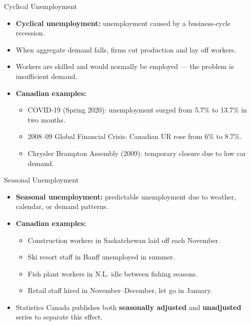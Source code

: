 \documentclass[aspectratio=169]{beamer}
\begin{document}
\begin{frame}{Cyclical Unemployment}
\transfade
\begin{itemize}
  \item \textbf{Cyclical unemployment:} unemployment caused by a \alert{business-cycle recession}.
  \item When aggregate demand falls, firms cut production and lay off workers.
  \item Workers are skilled and would normally be employed --- the problem is insufficient demand.
  \item \textbf{Canadian examples:}
  \begin{itemize}
    \item COVID-19 (Spring 2020): unemployment surged from 5.7\% to 13.7\% in two months.
    \item 2008--09 Global Financial Crisis: Canadian UR rose from 6\% to 8.7\%.
    \item Chrysler Brampton Assembly (2009): temporary closure due to low car demand.
  \end{itemize}
\end{itemize}
\end{frame}

\begin{frame}{Seasonal Unemployment}
\transfade
\begin{itemize}
  \item \textbf{Seasonal unemployment:} predictable unemployment due to weather, calendar, or demand patterns.
  \item \textbf{Canadian examples:}
  \begin{itemize}
    \item Construction workers in Saskatchewan laid off each November.
    \item Ski resort staff in Banff unemployed in summer.
    \item Fish plant workers in N.L. idle between fishing seasons.
    \item Retail staff hired in November--December, let go in January.
  \end{itemize}
  \item Statistics Canada publishes both \textbf{seasonally adjusted} and \textbf{unadjusted} series to separate this effect.
\end{itemize}
\end{frame}
\end{document}
